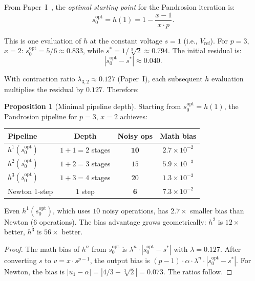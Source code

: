 \documentclass[11pt,a4paper]{article}
\theoremstyle{definition}
\newtheorem{proposition}{Proposition}[section]
\newcommand{\cbrt}[1]{\sqrt[3]{#1}}
\begin{document}
From Paper~I~\cite{besevic2026}, the \emph{optimal starting point} for the Pandrosion iteration is:
\begin{equation}
  \label{eq:s0opt}
  s_0^{\mathrm{opt}} = h(1) = 1 - \frac{x-1}{x \cdot p}.
\end{equation}

This is one evaluation of $h$ at the constant voltage $s = 1$ (i.e., $V_{\text{ref}}$).  For $p = 3$, $x = 2$: $s_0^{\mathrm{opt}} = 5/6 \approx 0.833$, while $s^* = 1/\cbrt{2} \approx 0.794$.  The initial residual is:
\[
  |s_0^{\mathrm{opt}} - s^*| \approx 0.040.
\]

With contraction ratio $\lambda_{3,2} \approx 0.127$ (Paper~I), each subsequent $h$ evaluation multiplies the residual by $0.127$.  Therefore:

\begin{proposition}[Minimal pipeline depth]
\label{prop:minimal}
Starting from $s_0^{\mathrm{opt}} = h(1)$, the Pandrosion pipeline for $p = 3$, $x = 2$ achieves:
\begin{center}
\begin{tabular}{lccc}
\toprule
\textbf{Pipeline} & \textbf{Depth} & \textbf{Noisy ops} & \textbf{Math bias} \\
\midrule
$h^1(s_0^{\mathrm{opt}})$ & $1 + 1 = 2$ stages & $\mathbf{10}$ & $2.7 \times 10^{-2}$ \\
$h^2(s_0^{\mathrm{opt}})$ & $1 + 2 = 3$ stages & $15$ & $5.9 \times 10^{-3}$ \\
$h^3(s_0^{\mathrm{opt}})$ & $1 + 3 = 4$ stages & $20$ & $1.3 \times 10^{-3}$ \\
\midrule
Newton 1-step & $1$ step & $\mathbf{6}$ & $7.3 \times 10^{-2}$ \\
\bottomrule
\end{tabular}
\end{center}
Even $h^1(s_0^{\mathrm{opt}})$, which uses $10$ noisy operations, has $2.7\times$ smaller bias than Newton ($6$ operations).  The bias advantage grows geometrically: $h^2$ is $12\times$ better, $h^3$ is $56\times$ better.
\end{proposition}

\begin{proof}
The math bias of $h^n$ from $s_0^{\mathrm{opt}}$ is $\lambda^n \cdot |s_0^{\mathrm{opt}} - s^*|$ with $\lambda = 0.127$.  After converting $s$ to $v = x \cdot s^{p-1}$, the output bias is $(p-1) \cdot \alpha \cdot \lambda^n \cdot |s_0^{\mathrm{opt}} - s^*|$.  For Newton, the bias is $|u_1 - \alpha| = |4/3 - \cbrt{2}| = 0.073$.  The ratios follow.
\end{proof}
\end{document}
